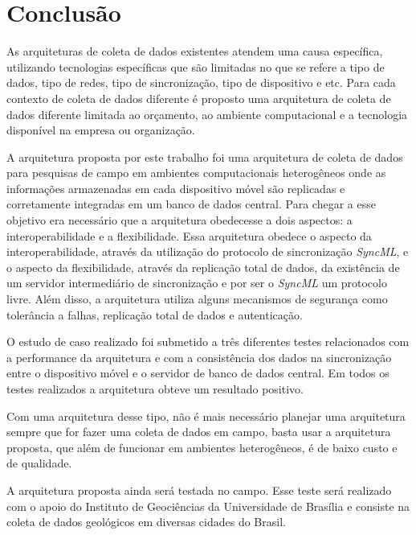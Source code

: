 \chapter{Conclusão}

As arquiteturas de coleta de dados existentes atendem uma causa específica, utilizando tecnologias específicas que são limitadas no que se refere a tipo de dados, tipo de redes, tipo de sincronização, tipo de dispositivo e etc. Para cada contexto de coleta de dados diferente é proposto uma arquitetura de coleta de dados diferente limitada ao orçamento, ao ambiente computacional e a tecnologia disponível na empresa ou organização.

A arquitetura proposta por este trabalho foi uma arquitetura de coleta de dados para pesquisas de campo em ambientes computacionais heterogêneos onde as informações armazenadas em cada dispositivo móvel são replicadas e corretamente integradas em um banco de dados central. Para chegar a esse objetivo era necessário que a arquitetura obedecesse a dois aspectos: a interoperabilidade e a flexibilidade. Essa arquitetura obedece o aspecto da interoperabilidade, através da utilização do protocolo de sincronização \textit{SyncML}, e o aspecto da flexibilidade, através da replicação total de dados, da existência de um servidor intermediário de sincronização e por ser o \textit{SyncML} um protocolo livre. Além disso, a arquitetura utiliza alguns mecanismos de segurança como tolerância a falhas, replicação total de dados e autenticação.

O estudo de caso realizado foi submetido a três diferentes testes relacionados com a performance da arquitetura e com a consistência dos dados na sincronização entre o dispositivo móvel e o servidor de banco de dados central. Em todos os testes realizados a arquitetura obteve um resultado positivo.

Com uma arquitetura desse tipo, não é mais necessário planejar uma arquitetura sempre que for fazer uma coleta de dados em campo, basta usar a arquitetura proposta, que além de funcionar em ambientes heterogêneos, é de baixo custo e de qualidade.

A arquitetura proposta ainda será testada no campo. Esse teste será realizado com o apoio do Instituto de Geociências da Universidade de Brasília e consiste na coleta de dados geológicos em diversas cidades do Brasil.